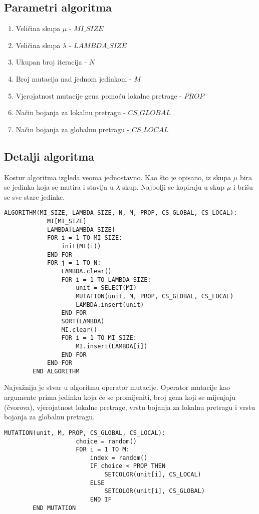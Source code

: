 \documentclass[times, utf8, diplomski, numeric]{fer}
\begin{document}
\subsection{Parametri algoritma}

\begin{enumerate}
	\item Veličina skupa $\mu$ - $MI\_SIZE$
	\item Veličina skupa $\lambda$ - $LAMBDA\_SIZE$
	\item Ukupan broj iteracija - $N$
	\item Broj mutacija nad jednom jedinkom - $M$
	\item Vjerojatnost mutacije gena pomoću lokalne pretrage - $PROP$
	\item Način bojanja za lokalnu pretragu - $CS\_GLOBAL$
	\item Način bojanja za globalnu pretragu - $CS\_LOCAL$
\end{enumerate}

\subsection{Detalji algoritma}

Kostur algoritma izgleda veoma jednostavno. Kao što je opisano, iz skupa $\mu$ bira se jedinka koja se mutira i stavlja u $\lambda$ skup. Najbolji se kopiraju u skup $\mu$ i brišu se sve stare jedinke. 

\begin{singlespace}
	\begin{lstlisting}[caption=Pseudok\^{o}d evolucijske strategije]
		ALGORITHM(MI_SIZE, LAMBDA_SIZE, N, M, PROP, CS_GLOBAL, CS_LOCAL):
			MI[MI_SIZE]
			LAMBDA[LAMBDA_SIZE]
			FOR i = 1 TO MI_SIZE:
				init(MI(i))
			END FOR
			FOR j = 1 TO N:
				LAMBDA.clear()
				FOR i = 1 TO LAMBDA_SIZE:
					unit = SELECT(MI)
					MUTATION(unit, M, PROP, CS_GLOBAL, CS_LOCAL)
					LAMBDA.insert(unit)
				END FOR
				SORT(LAMBDA)
				MI.clear()
				FOR i = 1 TO MI_SIZE:
					MI.insert(LAMBDA[i])
				END FOR
			END FOR
		END ALGORITHM
	\end{lstlisting}
\end{singlespace}

Najvažnija je stvar u algoritmu operator mutacije. Operator mutacije kao argumente prima jedinku koja će se promijeniti, broj gena koji se mijenjaju (čvorova), vjerojatnost lokalne pretrage, vrstu bojanja za lokalnu pretragu i vrstu bojanja za globalnu pretragu. 

\begin{singlespace}
	\begin{lstlisting}[caption=Pseudok\^{o}d mutacije evolucijske strategije]
		MUTATION(unit, M, PROP, CS_GLOBAL, CS_LOCAL):
					choice = random()
					FOR i = 1 TO M:
						index = random()
						IF choice < PROP THEN
							SETCOLOR(unit[i], CS_LOCAL)
						ELSE
							SETCOLOR(unit[i], CS_GLOBAL)
						END IF
		END MUTATION
	\end{lstlisting}
\end{singlespace}
\end{document}
